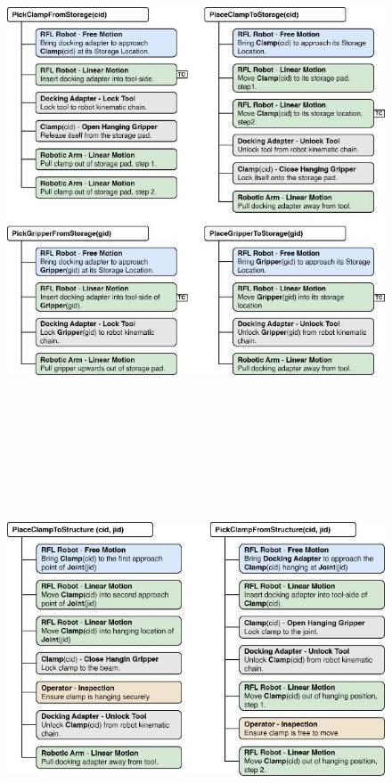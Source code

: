 \documentclass[11pt]{book}
\begin{document}
\begin{itemize}
\begin{figure}[H]
\includegraphics[width=15.92cm,height=15.49cm]{./images/image20.jpeg}
\end{figure}


\begin{figure}[H]
\includegraphics[width=15.92cm,height=10.72cm]{./images/image21.jpeg}
\end{figure}



\end{itemize}
\end{document}
